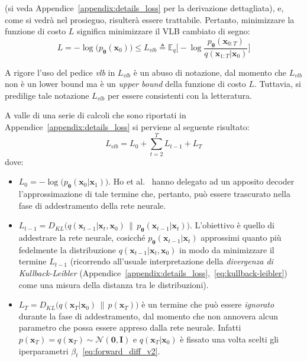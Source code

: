 (si veda Appendice~\ref{appendix:details_loss} per la derivazione dettagliata), e, come si vedrà nel prosieguo, risulterà essere trattabile. 
Pertanto, minimizzare la funzione di costo $L$ significa minimizzare il VLB cambiato di segno:
\begin{equation}
    L=-\log \bigl(p_{\bm{\theta}}(\mathbf{x}_0)\bigr)\leq L_{vlb}\triangleq\mathbb{E}_q\biggl[-\log\frac{p_{\bm{\theta}}(\mathbf{x}_{0:T})}{q(\mathbf{x}_{1:T}|\mathbf{x}_0)}\biggr]
\end{equation}
\begin{oss}
A rigore l'uso del pedice \emph{vlb} in $L_{vlb}$ è un abuso di notazione, dal momento che $L_{vlb}$ non è 
un lower bound ma è un \emph{upper bound} della funzione di costo $L$. Tuttavia, si predilige 
tale notazione $L_{vlb}$ per essere consistenti con la letteratura.
\end{oss}
\noindent A valle di una serie di calcoli che sono riportati in Appendice~\ref{appendix:details_loss} si perviene al seguente risultato:
\begin{equation}
    L_{vlb}=L_0+\sum_{t=2}^TL_{t-1}+L_T \label{eq:Lvlb}
\end{equation}
dove:
\begin{itemize}
    \item $L_0=-\log \bigl(p_{\bm{\theta}}(\mathbf{x}_0|\mathbf{x}_1)\bigr)$. Ho et al.~\cite{ho2020} hanno delegato ad un apposito decoder l'approssimazione di tale termine
    che, pertanto, può essere trascurato nella fase di addestramento della rete neurale.
    \item $L_{t-1}=D_{KL}\bigl(q(\mathbf{x}_{t-1}|\mathbf{x}_t,\mathbf{x}_0)\,\|\,p_{\bm{\theta}}(\mathbf{x}_{t-1}|\mathbf{x}_t)\bigr)$. L'obiettivo  
    è quello di addestrare la rete neurale, cosicché $p_{\bm{\theta}}(\mathbf{x}_{t-1}|\mathbf{x}_t)$ approssimi 
    quanto più fedelmente la distribuzione $q(\mathbf{x}_{t-1}|\mathbf{x}_t,\mathbf{x}_0)$ in 
    modo da minimizzare il termine $L_{t-1}$ (ricorrendo all'usuale interpretazione della \emph{divergenza di Kullback-Leibler} 
    (Appendice~\ref{appendix:details_loss},~\ref{eq:kullback-leibler})
    come una misura della distanza tra le distribuzioni).
    \item $L_T=D_{KL}\bigl(q(\mathbf{x}_T|\mathbf{x}_0)\,\|\,p(\mathbf{x}_T)\bigr)$ è un termine che può essere \emph{ignorato} durante 
    la fase di addestramento, dal momento che non annovera alcun parametro che possa essere appreso dalla rete neurale. 
    Infatti $p(\mathbf{x}_T)=q(\mathbf{x}_T)\sim\mathcal{N}(\bm{0},\bm{I})$ 
    e $q(\mathbf{x}_T|\mathbf{x}_0)$ è fissato una volta scelti gli iperparametri $\beta_t$~\eqref{eq:forward_diff_v2}.
\end{itemize}

